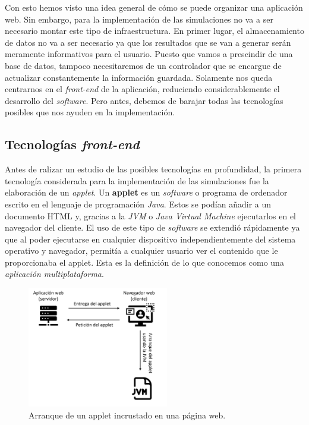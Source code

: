 \documentclass[../main.tex]{subfiles}
\begin{document}
    
    Con esto hemos visto una idea general de cómo se puede organizar una aplicación web. Sin embargo, para la implementación de las simulaciones no va a ser necesario montar este tipo de infraestructura. En primer lugar, el almacenamiento de datos no va a ser necesario ya que los resultados que se van a generar serán meramente informativos para el usuario. Puesto que vamos a prescindir de una base de datos, tampoco necesitaremos de un controlador que se encargue de actualizar constantemente la información guardada. Solamente nos queda centrarnos en el \textit{front-end} de la aplicación, reduciendo considerablemente el desarrollo del \textit{software}. Pero antes, debemos de barajar todas las tecnologías posibles que nos ayuden en la implementación.
    
    
    \subsection{Tecnologías \textit{front-end}}
    Antes de ralizar un estudio de las posibles tecnologías en profundidad, la primera tecnología considerada para la implementación de las simulaciones fue la elaboración de un \textit{applet}. Un \textbf{applet} \cite{aplicacionesyapplets} es un \textit{software} o programa de ordenador escrito en el lenguaje de programación \textit{Java}. Estos se podían añadir a un documento HTML y, gracias a la \textit{JVM} o \textit{Java Virtual Machine} ejecutarlos en el navegador del cliente. El uso de este tipo de \textit{software} se extendió rápidamente ya que al poder ejecutarse en cualquier dispositivo independientemente del sistema operativo y navegador, permitía a cualquier usuario ver el contenido que le proporcionaba el applet. Esta es la definición de lo que conocemos como una \textit{aplicación multiplataforma}.
    
    \begin{figure}[!h]
          \centering
          \includegraphics[width=0.55\textwidth]{images/arranque_applet.png}
          \caption{Arranque de un applet incrustado en una página web.}
          \label{fig:arranque_applet}
      \end{figure}
     
\end{document}
